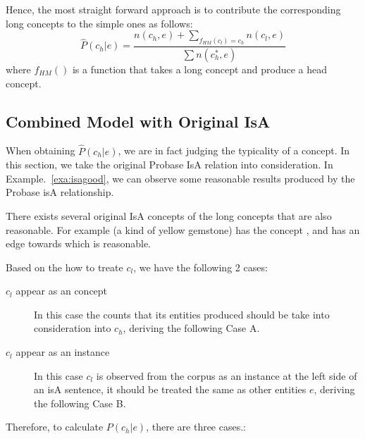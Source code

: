 Hence, the most straight forward approach is to contribute the corresponding long concepts to the simple ones as follows:
$$\hat{P}(c_h|e)=\frac{n(c_h,e)+\sum_{ f_{HM}(c_l)=c_h} n(c_l,e)}{ \sum n(c_h^*,e)} $$
where $f_{HM}()$ is a function that takes a long concept and produce a head concept.

\subsection{Combined Model with Original IsA}
When obtaining $\hat{P}(c_h|e)$, we are in fact judging the typicality of a concept.
In this section, we take the original Probase IsA relation into consideration. In Example.~\ref{exa:isagood}, we can observe some reasonable results produced by the Probase isA relationship.

\begin{example}
\label{exa:isagood}
  There exists several original IsA concepts of the long concepts that are also reasonable. For example (a kind of yellow gemstone) has the concept , and  has an edge towards  which is reasonable.
\end{example}

Based on the how to treate $c_l$, we have the following 2 cases:

\begin{description}
  \item[$c_l$ appear as an concept] In this case the counts that its entities produced should be take into consideration into $c_h$, deriving the following Case A.
  \item[$c_l$ appear as an instance] In this case $c_l$ is observed from the corpus as an instance at the left side of an isA sentence, it should be treated the same as other entities $e$, deriving the following Case B.
\end{description}


Therefore, to calculate  $P({c_h}|e)$, there are three cases.:


